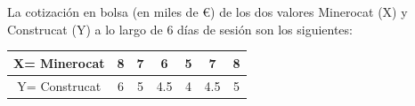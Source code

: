 \documentclass[addpoints,spanish, 12pt,a4paper]{exam}
\begin{document}
\begin{questions}

\question La cotización en bolsa (en miles de \euro) de los dos valores Minerocat (X) y Construcat (Y) a lo largo de 6 días de sesión son los siguientes:
\begin{center}
\begin{tabular}{|c|c|c|c|c|c|c|}
    \hline
    X= Minerocat & 8 & 7 & 6 & 5 & 7 & 8 \\
    \hline
    Y= Construcat & 6 & 5 & 4.5 & 4 & 4.5 & 5  \\
    \hline
\end{tabular}
   
\end{center}

\end{questions}
\end{document}
